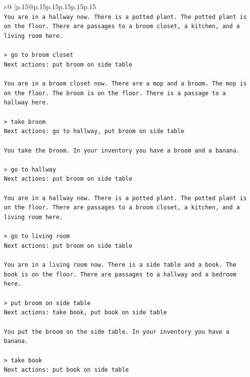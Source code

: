\documentclass{article}
\begin{document}
{\begin{supertabular}{c@{$\;$}|p{.15\linewidth}@{}p{.15\linewidth}p{.15\linewidth}p{.15\linewidth}p{.15\linewidth}p{.15\linewidth}}
{{{\\ 
\texttt{You are in a hallway now. There is a potted plant. The potted plant is on the floor. There are passages to a broom closet, a kitchen, and a living room here.} \\
\\ 
\texttt{> go to broom closet  } \\
\texttt{Next actions: put broom on side table} \\
\\ 
\texttt{You are in a broom closet now. There are a mop and a broom. The mop is on the floor. The broom is on the floor. There is a passage to a hallway here.} \\
\\ 
\texttt{> take broom  } \\
\texttt{Next actions: go to hallway, put broom on side table} \\
\\ 
\texttt{You take the broom. In your inventory you have a broom and a banana.} \\
\\ 
\texttt{> go to hallway  } \\
\texttt{Next actions: put broom on side table} \\
\\ 
\texttt{You are in a hallway now. There is a potted plant. The potted plant is on the floor. There are passages to a broom closet, a kitchen, and a living room here.} \\
\\ 
\texttt{> go to living room  } \\
\texttt{Next actions: put broom on side table} \\
\\ 
\texttt{You are in a living room now. There is a side table and a book. The book is on the floor. There are passages to a hallway and a bedroom here.} \\
\\ 
\texttt{> put broom on side table  } \\
\texttt{Next actions: take book, put book on side table} \\
\\ 
\texttt{You put the broom on the side table. In your inventory you have a banana.} \\
\\ 
\texttt{> take book  } \\
\texttt{Next actions: put book on side table} \\
\\ 
}}}
\end{supertabular}}
\end{document}
